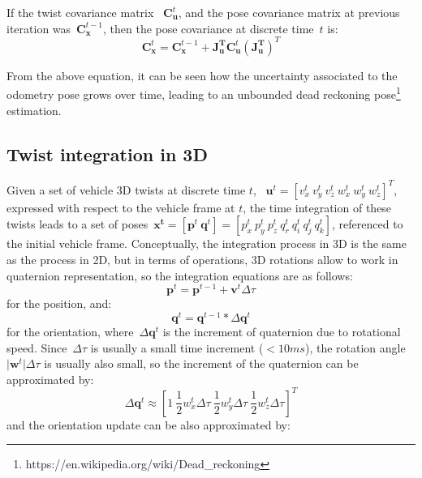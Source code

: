If the twist covariance matrix ~$\mathbf{C}^t_{\mathbf{u}}$, and the pose covariance matrix at previous iteration was~$\mathbf{C}^{t-1}_{\mathbf{x}}$, then the pose covariance at discrete time~$t$ is: 
\begin{equation}
 \mathbf{C}^t_{\mathbf{x}} = \mathbf{C}^{t-1}_{\mathbf{x}} +  
    \mathbf{J}^{\mathbf{T}}_{\mathbf{u}}
    \mathbf{C}^t_{\mathbf{u}}
    (\mathbf{J}^{\mathbf{T}}_{\mathbf{u}})^T
\end{equation}

From the above equation, it can be seen how the uncertainty associated to the odometry pose grows over time, leading to an unbounded dead reckoning pose\footnote{https://en.wikipedia.org/wiki/Dead_reckoning} estimation.


\subsection{Twist integration in 3D}
Given a set of vehicle 3D twists at discrete time $t$, ~$\mathbf{u}^t=[v^t_x\ v^t_y\ v^t_z\ w^t_x \ w^t_y \ w^t_z]^T$, expressed with respect to the vehicle frame at $t$, the time integration of these twists leads to a set of poses~$\mathbf{x^t}=[\mathbf{p}^t\ \mathbf{q}^t ]=[p^t_x\ p^t_y\ p^t_z\ q^t_r\ q^t_i\ q^t_j\ q^t_k]$, referenced to the initial vehicle frame. Conceptually, the integration process in 3D is the same as the process in 2D, but in terms of operations, 3D rotations allow to work in quaternion representation, so the integration equations are as follows: 
\begin{equation}
\mathbf{p}^t = \mathbf{p}^{t-1} + \mathbf{v}^t\Delta\tau
\end{equation}
for the position, and: 
\begin{equation}
\mathbf{q}^t = \mathbf{q}^{t-1}*\Delta\mathbf{q}^t
\end{equation}
for the orientation, where~$\Delta\mathbf{q}^t$ is the increment of quaternion due to rotational speed. Since~$\Delta\tau$ is usually a small time increment ($<10ms$), the rotation angle $\vert\mathbf{w}^t \vert \Delta\tau$ is usually also small, so  the increment of the quaternion can be approximated by: 
\begin{equation}
 \Delta\mathbf{q}^t \approx [1\ \frac{1}{2}w^t_x\Delta\tau\ \frac{1}{2}w^t_y\Delta\tau\ \frac{1}{2}w^t_z\Delta\tau ]^T
\end{equation}
and the orientation update can be also approximated by: 
